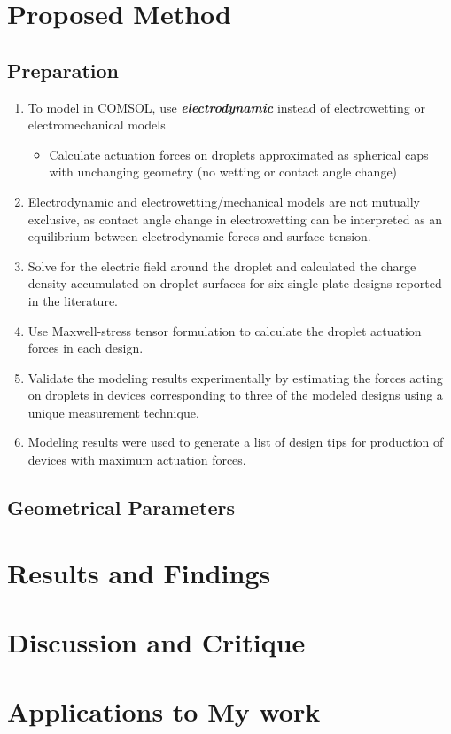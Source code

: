 \section{Proposed Method}
\subsection{Preparation}
\begin{enumerate}
    \item To model in COMSOL, use \textbf{\emph{electrodynamic}} instead of electrowetting or electromechanical models
    \begin{itemize}
        \item Calculate actuation forces on droplets approximated as spherical caps with unchanging geometry (no wetting or contact angle change)
    \end{itemize}
    \item Electrodynamic and electrowetting/mechanical models are not mutually \newline exclusive, as contact angle change in electrowetting can be interpreted as an equilibrium between electrodynamic forces and surface tension.
    \item Solve for the electric field around the droplet and calculated the charge \newline density accumulated on droplet surfaces for six single-plate designs \newline reported in the literature.
    \item Use Maxwell-stress tensor formulation to calculate the droplet actuation forces in each design.
    \item Validate the modeling results experimentally by estimating the forces acting on droplets in devices corresponding to three of the modeled designs using a unique measurement technique.
    \item Modeling results were used to generate a list of
    design tips for production of devices with maximum actuation forces.
\end{enumerate}
\subsection{Geometrical Parameters}
\section{Results and Findings}
\section{Discussion and Critique}
\section{Applications to My work}